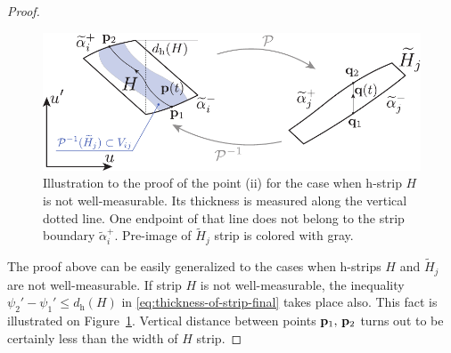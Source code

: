 \begin{proof}
	\begin{figure}[h]
	\centering
		\includegraphics[scale = 1]{pic/thickness of h-strip (b)}
		\caption{
			Illustration to the proof of the point (ii) for the case when h-strip $H$ is not well-measurable.
			Its thickness is measured along the vertical dotted line.
			One endpoint of that line does not belong to the strip boundary $\widetilde{\alpha}_i^+$.
			Pre-image of $\widetilde{H}_j$ strip is colored with gray.
		}
	\label{fig:thickness-of-h-strip-b}
	\end{figure}
	
	The proof above can be easily generalized to the cases when h-strips  $H$ and $\widetilde{H}_j$ are not well-measurable.
	If strip $H$ is not well-measurable, the inequality $\psi_2' - \psi_1' \le d_{\mathrm{h}}(H)$ in \eqref{eq:thickness-of-strip-final} takes place also.
	This fact is illustrated on Figure~\ref{fig:thickness-of-h-strip-b}.
	Vertical distance between points $\vb{p}_1, \, \vb{p}_2$ turns out to be certainly less than the width of $H$ strip.
	

\end{proof}
